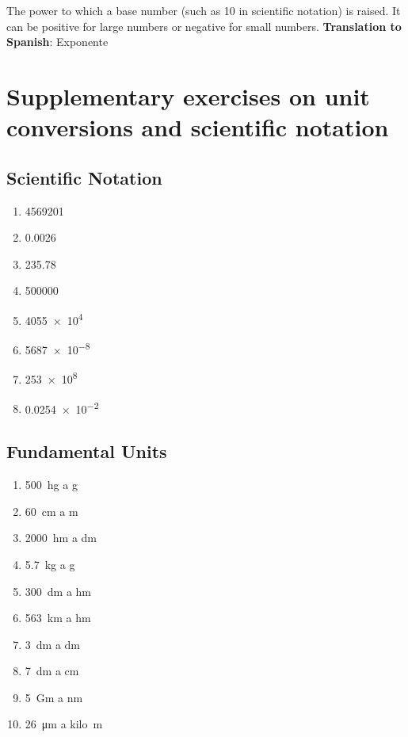 \begin{vocabulary}[Exponent]
The power to which a base number (such as 10 in scientific notation) is raised. It can be positive for large numbers or negative for small numbers. \newline
\textbf{Translation to Spanish}: Exponente \newline
\end{vocabulary}


\section{Supplementary exercises on unit conversions and scientific notation}

\subsection{Scientific Notation}

\begin{exercise}
    \phantom{a}
    \begin{enumerate}[label=\letraminuscula]
        \item \num{4569201}
        \item \num{0.0026}
        \item \num{235.78}
        \item \num{500000}
        \item \num{4055e4}
        \item \num{5687e-8}
        \item \num{253e8}
        \item \num{0.0254e-2}
    \end{enumerate}
\end{exercise}

\subsection{Fundamental Units}

\begin{exercise}
    \phantom{a}
    \begin{enumerate}[label=\letraminuscula]
        \item \qty{500}{\hecto\g} a \unit{\g}
        \item \qty{60}{\centi\metre} a \unit{\metre}
        \item \qty{2000}{\hecto\metre} a \unit{\deca\metre}
        \item \qty{5.7}{\kilo\g} a \unit{\g}
        \item \qty{300}{\deci\metre} a \unit{\hecto\metre}
        \item \qty{563}{\kilo\metre} a \unit{\hecto\metre}
        \item \qty{3}{\deci\metre} a \unit{\deca\metre}
        \item \qty{7}{\deci\metre} a \unit{\centi\metre}
        \item  \qty{5}{\giga\m} a \unit{\nano\m}
        \item \qty{26}{\micro\m} a \unit{kilo\m}
    \end{enumerate}
\end{exercise}


